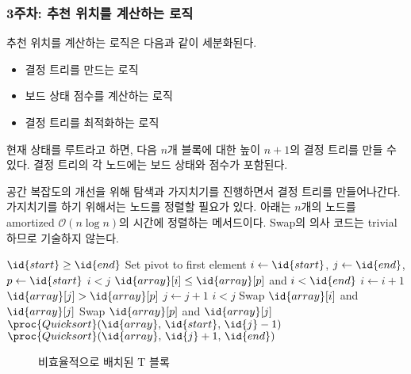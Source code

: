 \subsubsection{3주차: 추천 위치를 계산하는 로직} 추천 위치를 계산하는 로직은 다음과 같이 세분화된다.
\begin{itemize}
    \item 결정 트리를 만드는 로직
    \item 보드 상태 점수를 계산하는 로직
    \item 결정 트리를 최적화하는 로직
\end{itemize}

현재 상태를 루트라고 하면, 다음 $n$개 블록에 대한 높이 $n+1$의 결정 트리를 만들 수 있다. 결정 트리의 각 노드에는
보드 상태와 점수가 포함된다.

공간 복잡도의 개선을 위해 탐색과 가지치기를 진행하면서 결정 트리를 만들어나간다. 가지치기를 하기 위해서는
노드를 정렬할 필요가 있다. 아래는 $n$개의 노드를 amortized $\mathcal{O}\left(n \log n\right)$의
시간에 정렬하는 메서드이다. Swap의 의사 코드는 trivial하므로 기술하지 않는다.

\begin{codebox}
\li \If $\id{start} \geq \id{end}$ \Then
\li     \Return
    \End
\li \Comment Set pivot to first element
\li $i \gets \id{start}$, $j \gets \id{end}$, $p \gets \id{start}$
\li \While $i < j$ \Do
\li     \While $\id{array}[i] \leq \id{array}[p]$ and $i < \id{end}$ \Do
\li         $i \gets i + 1$
        \End
\li     \While $\id{array}[j] > \id{array}[p]$ \Do
\li         $j \gets j + 1$
        \End
\li     \If $i<j$ \Then
\li         Swap $\id{array}[i]$ and $\id{array}[j]$
        \End
    \End
\li Swap $\id{array}[p]$ and $\id{array}[j]$
\li $\proc{Quicksort}(\id{array},\,\id{start},\,\id{j} - 1)$
\li $\proc{Quicksort}(\id{array},\,\id{j} + 1,\,\id{end})$
\end{codebox}

\begin{wrapfigure}[8]{l}{0.4\textwidth}
    \caption{비효율적으로 배치된 T 블록}
    \label{fig:inefficient-t}
\end{wrapfigure}

